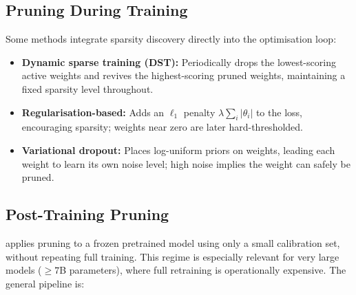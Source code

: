 \subsection{Pruning During Training}

Some methods integrate sparsity discovery directly into the optimisation loop:

\begin{itemize}
	\item \textbf{Dynamic sparse training (DST):}  Periodically drops the
	lowest-scoring active weights and revives the highest-scoring pruned
	weights, maintaining a fixed sparsity level throughout.
	\item \textbf{Regularisation-based:}  Adds an $\ell_1$ penalty
	$\lambda \sum_i |\theta_i|$ to the loss, encouraging sparsity; weights
	near zero are later hard-thresholded.
	\item \textbf{Variational dropout:}  Places log-uniform priors on weights,
	leading each weight to learn its own noise level; high noise implies the
	weight can safely be pruned.
\end{itemize}

\subsection{Post-Training Pruning}
\label{sec:post_training_pruning}

 applies pruning to a frozen pretrained
model using only a small calibration set, without repeating full training.
This regime is especially relevant for very large models ($\ge 7$B parameters),
where full retraining is operationally expensive. The general pipeline is:

